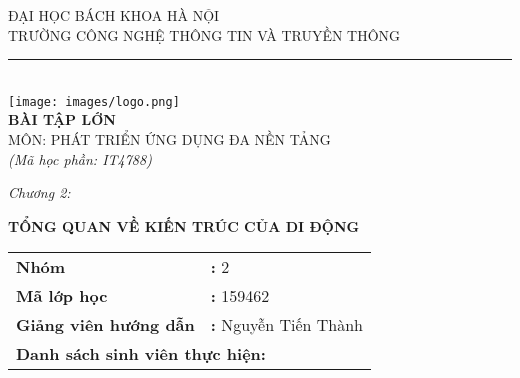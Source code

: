 \documentclass[12pt]{report}
\begin{document}
\thispagestyle{empty}


\begin{center}
    \vspace{-0.8cm}
    ĐẠI HỌC BÁCH KHOA HÀ NỘI\\
    TRƯỜNG CÔNG NGHỆ THÔNG TIN VÀ TRUYỀN THÔNG\\
    \rule{0.6\textwidth}{0.4pt} \\[0.9cm]
    \texttt{[image: images/logo.png]} \\[1.4cm]
    {\LARGE \textbf{BÀI TẬP LỚN}}\\[0.3cm]
    {\normalsize MÔN: PHÁT TRIỂN ỨNG DỤNG ĐA NỀN TẢNG}\\
    \textit{(Mã học phần: IT4788)}\\[1.6cm]
    \raggedright \textit{\Large Chương 2:}\\
    \begin{center}
        \textbf{\Large TỔNG QUAN VỀ KIẾN TRÚC CỦA DI ĐỘNG}
    \end{center}
\end{center}

\vspace{2.6cm}

\hspace*{0.6cm}
\begin{tabular}{ll}
  \textbf{Nhóm} & \hspace{0.99cm}\textbf{:} 2 \\
  \textbf{Mã lớp học} & \hspace{0.99cm}\textbf{:} 159462 \\
  \textbf{Giảng viên hướng dẫn} & \hspace{0.99cm}\textbf{:} Nguyễn Tiến Thành \\
  \multicolumn{2}{l}{\textbf{Danh sách sinh viên thực hiện:}} \\
\end{tabular}
\end{document}
